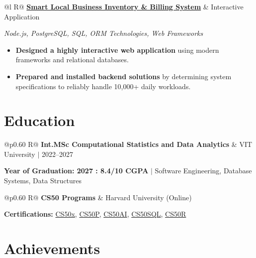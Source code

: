 \documentclass[a4paper,11pt]{article}
\newcommand{\subheading}[1]{\textbf{#1}}
\newcommand{\meta}[1]{{\fontsize{10}{12}\selectfont\textcolor[HTML]{3A3A3A}{#1}}}
\newcommand{\techstack}[1]{{\fontsize{10}{12}\selectfont\textcolor[HTML]{1A1A1A}{\textit{#1}}}}
\newcommand{\ulink}[2]{\href{#1}{#2}}
\begin{document}
\begin{tabularx}{\linewidth}{@{}l R@{}}
\subheading{\ulink{https://github.com/su-jin1425/Smart-Local-Business-Inventory-Billing-System}{Smart Local Business Inventory \& Billing System}} & \meta{Interactive Application}
\end{tabularx}
\techstack{Node.js, PostgreSQL, SQL, ORM Technologies, Web Frameworks}
\begin{itemize}[nosep, leftmargin=1.5em, itemsep=2pt, topsep=2pt]
  \item {\color[HTML]{0A0A0A}\fontsize{11}{14}\selectfont \textbf{Designed a highly interactive web application} using modern frameworks and relational databases.}
  \item {\color[HTML]{0A0A0A}\fontsize{11}{14}\selectfont \textbf{Prepared and installed backend solutions} by determining system specifications to reliably handle 10,000+ daily workloads.}
\end{itemize}

\section{Education}
\vspace{2pt}

\begin{tabularx}{\linewidth}{@{}p{0.60\linewidth} R@{}}
\subheading{Int.MSc Computational Statistics and Data Analytics} & \meta{VIT University $|$ 2022--2027}
\end{tabularx}
{\color[HTML]{3A3A3A}\fontsize{11}{14}\selectfont \textbf{Year of Graduation: 2027 : 8.4/10 CGPA} $|$ Software Engineering, Database Systems, Data Structures}

\begin{tabularx}{\linewidth}{@{}p{0.60\linewidth} R@{}}
\subheading{CS50 Programs} & \meta{Harvard University (Online)}
\end{tabularx}
{\color[HTML]{3A3A3A}\fontsize{11}{14}\selectfont \textbf{Certifications:} \ulink{https://cs50.harvard.edu/certificates/b14b78df-e05c-413e-a607-1dd27303053a}{CS50x}, \ulink{https://cs50.harvard.edu/certificates/32477052-9db4-49c4-a5a4-d7e58429ca2c}{CS50P}, \ulink{https://cs50.harvard.edu/certificates/9cdb4d4a-1250-4f8e-9fd7-191864e0f919}{CS50AI}, \ulink{https://cs50.harvard.edu/certificates/bc486f24-f085-4e61-8536-80940b97a1b9}{CS50SQL}, \ulink{https://cs50.harvard.edu/certificates/666838e6-a053-4d82-b179-a60fe745fd84}{CS50R}}

\section{Achievements}
\vspace{2pt}
\end{document}
